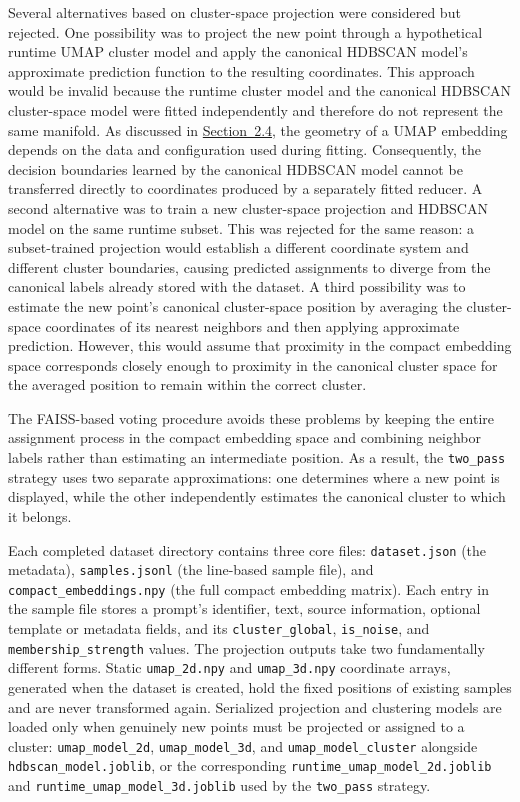 Several alternatives based on cluster-space projection were considered but rejected. One possibility was to project the new point through a hypothetical runtime UMAP cluster model and apply the canonical HDBSCAN model's approximate prediction function to the resulting coordinates. This approach would be invalid because the runtime cluster model and the canonical HDBSCAN cluster-space model were fitted independently and therefore do not represent the same manifold. As discussed in \hyperref[sec:2.4]{Section~2.4}, the geometry of a UMAP embedding depends on the data and configuration used during fitting. Consequently, the decision boundaries learned by the canonical HDBSCAN model cannot be transferred directly to coordinates produced by a separately fitted reducer.
A second alternative was to train a new cluster-space projection and HDBSCAN model on the same runtime subset. This was rejected for the same reason: a subset-trained projection would establish a different coordinate system and different cluster boundaries, causing predicted assignments to diverge from the canonical labels already stored with the dataset. A third possibility was to estimate the new point's canonical cluster-space position by averaging the cluster-space coordinates of its nearest neighbors and then applying approximate prediction. However, this would assume that proximity in the compact embedding space corresponds closely enough to proximity in the canonical cluster space for the averaged position to remain within the correct cluster.

The FAISS-based voting procedure avoids these problems by keeping the entire assignment process in the compact embedding space and combining neighbor labels rather than estimating an intermediate position. As a result, the \texttt{two\_pass} strategy uses two separate approximations: one determines where a new point is displayed, while the other independently estimates the canonical cluster to which it belongs.

Each completed dataset directory contains three core files: \texttt{dataset.json} (the metadata), \texttt{samples.jsonl} (the line-based sample file), and \texttt{compact\_embeddings.npy} (the full compact embedding matrix). Each entry in the sample file stores a prompt's identifier, text, source information, optional template or metadata fields, and its \texttt{cluster\_global}, \texttt{is\_noise}, and \texttt{membership\_strength} values.
The projection outputs take two fundamentally different forms. Static \texttt{umap\_2d.npy} and \texttt{umap\_3d.npy} coordinate arrays, generated when the dataset is created, hold the fixed positions of existing samples and are never transformed again. Serialized projection and clustering models are loaded only when genuinely new points must be projected or assigned to a cluster: \texttt{umap\_model\_2d}, \texttt{umap\_model\_3d}, and \texttt{umap\_model\_cluster} alongside \texttt{hdbscan\_model.joblib}, or the corresponding \texttt{runtime\_umap\_model\_2d.joblib} and \texttt{runtime\_umap\_model\_3d.joblib} used by the \texttt{two\_pass} strategy.

